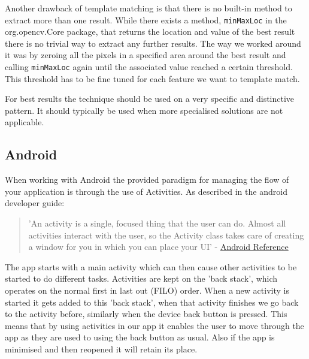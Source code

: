 Another drawback of template matching is that there is no built-in method to extract more than one result. While there exists a method, \verb!minMaxLoc! in the org.opencv.Core package, that returns the location and value of the best result there is no trivial way to extract any further results. The way we worked around it was by zeroing all the pixels in a specified area around the best result and calling \verb!minMaxLoc! again until the associated value reached a certain threshold. This threshold has to be fine tuned for each feature we want to template match.

For best results the technique should be used on a very specific and distinctive pattern. It should typically be used when more specialised solutions are not applicable.

    \subsection{Android} \label{sec:android}
When working with Android the provided paradigm for managing the flow of your application is through the use of Activities. As described in the android developer guide:

\begin{quote} 'An activity is a single, focused thing that the user can do. Almost all activities interact with the user, so the Activity class takes care of creating a window for you in which you can place your UI' - \href{http://developer.android.com/reference/android/app/Activity.html}{Android Reference}
\end{quote}  

The app starts with a main activity which can then cause other activities to be started to do different tasks. Activities are kept on the 'back stack', which operates on the normal first in last out (FILO) order. When a new activity is started it gets added to this 'back stack', when that activity finishes we go back to the activity before, similarly when the device back button is pressed. This means that by using
activities in our app it enables the user to move through the app as they are used to using the back button as usual. Also if the app is minimised and then reopened it will retain its place.

